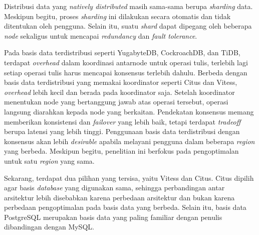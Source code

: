 Distribusi data yang \textit{natively distributed} masih sama-sama berupa \textit{sharding} data. Meskipun begitu, proses \textit{sharding} ini dilakukan secara otomatis dan tidak ditentukan oleh pengguna. Selain itu, suatu \textit{shard} dapat dipegang oleh beberapa \textit{node} sekaligus untuk mencapai \textit{redundancy} dan \textit{fault tolerance}.

Pada basis data terdistribusi seperti YugabyteDB, CockroachDB, dan TiDB, terdapat \textit{overhead} dalam koordinasi antarnode untuk operasi tulis, terlebih lagi setiap operasi tulis harus mencapai konsensus terlebih dahulu. Berbeda dengan basis data terdistribusi yang memakai koordinator seperti Citus dan Vitess, \textit{overhead} lebih kecil dan berada pada koordinator saja. Setelah koordinator menentukan node yang bertanggung jawab atas operasi tersebut, operasi langsung diarahkan kepada node yang berkaitan. Pendekatan konsensus memang memberikan konsistensi dan \textit{failover} yang lebih baik, tetapi terdapat \textit{tradeoff} berupa latensi yang lebih tinggi. Penggunaan basis data terdistribusi dengan konsensus akan lebih \textit{desirable} apabila melayani pengguna dalam beberapa \textit{region} yang berbeda. Meskipun begitu, penelitian ini berfokus pada pengoptimalan untuk satu \textit{region} yang sama.

Sekarang, terdapat dua pilihan yang tersisa, yaitu Vitess dan Citus. Citus dipilih agar basis \textit{database} yang digunakan sama, sehingga perbandingan antar arsitektur lebih disebabkan karena perbedaan arsitektur dan bukan karena perbedaan pengoptimalan pada basis data yang berbeda. Selain itu, basis data PostgreSQL merupakan basis data yang paling familiar dengan penulis dibandingan dengan MySQL.
